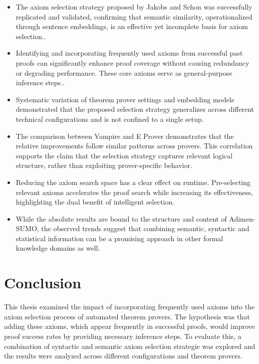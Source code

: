 \documentclass[english,version-2020-11]{uzl-thesis}
\begin{document}
\begin{itemize}
    \item The axiom selection strategy proposed by Jakobs and Schon was successfully replicated and validated, confirming that semantic similarity, operationalized through sentence embeddings, is an effective yet incomplete basis for axiom selection..
    
    \item Identifying and incorporating frequently used axioms from successful past proofs can significantly enhance proof coverage without causing redundancy or degrading performance. These core axioms serve as general-purpose inference steps..
    
    \item Systematic variation of theorem prover settings and embedding models demonstrated that the proposed selection strategy generalizes across different technical configurations and is not confined to a single setup.
    
    \item The comparison between Vampire and E Prover demonstrates that the relative improvements follow similar patterns across provers. This correlation supports the claim that the selection strategy captures relevant logical structure, rather than exploiting prover-specific behavior.
    
    \item Reducing the axiom search space has a clear effect on runtime. Pre-selecting relevant axioms accelerates the proof search while increasing its effectiveness, highlighting the dual benefit of intelligent selection.
    
    \item While the absolute results are bound to the structure and content of Adimen-SUMO, the observed trends suggest that combining semantic, syntactic and statistical information can be a promising approach in other formal knowledge domains as well.
\end{itemize}



\chapter{Conclusion}
\label{chapter-conclusion}
This thesis examined the impact of incorporating frequently used axioms into the axiom selection process of automated theorem provers. The hypothesis was that adding these axioms, which appear frequently in successful proofs, would improve proof success rates by providing necessary inference steps. To evaluate this, a combination of syntactic and semantic axiom selection strategie was explored and the results were analyzed across different configurations and theorem provers.
\end{document}
